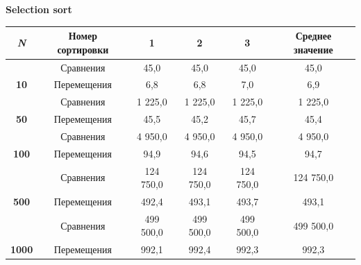\documentclass[a4paper,11pt]{article}
\begin{document}
    \hspace{6 cm}\textbf{\Large{Selection sort}}
    \vspace{0cm}
    \begin{table}[H]
        \begin{tabular}{|c|c|c|c|c|c|}
        \hline
        \textit{\textbf{N}}                                     & \textbf{Номер сортировки} & \textbf{1}   & \textbf{2}   & \textbf{3}   & \textbf{Среднее значение} \\ \hline
        {\color[HTML]{3F3B42} }                                 & Сравнения                 & 45,0         & 45,0         & 45,0         & 45,0                      \\ \cline{2-6} 
        \multirow{-2}{*}{{\color[HTML]{3F3B42} \textbf{10}}}    & Перемещения               & 6,8          & 6,8          & 7,0          & 6,9                       \\ \hline
        {\color[HTML]{3F3B42} }                                 & Сравнения                 & 1 225,0      & 1 225,0      & 1 225,0      & 1 225,0                   \\ \cline{2-6} 
        \multirow{-2}{*}{{\color[HTML]{3F3B42} \textbf{50}}}    & Перемещения               & 45,5         & 45,2         & 45,7         & 45,4                      \\ \hline
        {\color[HTML]{3F3B42} }                                 & Сравнения                 & 4 950,0      & 4 950,0      & 4 950,0      & 4 950,0                   \\ \cline{2-6} 
        \multirow{-2}{*}{{\color[HTML]{3F3B42} \textbf{100}}}   & Перемещения               & 94,9         & 94,6         & 94,5         & 94,7                      \\ \hline
        {\color[HTML]{3F3B42} }                                 & Сравнения                 & 124 750,0    & 124 750,0    & 124 750,0    & 124 750,0                 \\ \cline{2-6} 
        \multirow{-2}{*}{{\color[HTML]{3F3B42} \textbf{500}}}   & Перемещения               & 492,4        & 493,1        & 493,7        & 493,1                     \\ \hline
        {\color[HTML]{3F3B42} }                                 & Сравнения                 & 499 500,0    & 499 500,0    & 499 500,0    & 499 500,0                 \\ \cline{2-6} 
        \multirow{-2}{*}{{\color[HTML]{3F3B42} \textbf{1000}}}  & Перемещения               & 992,1        & 992,4        & 992,3        & 992,3                     \\ \hline

\end{tabular}
\end{table}
\end{document}
